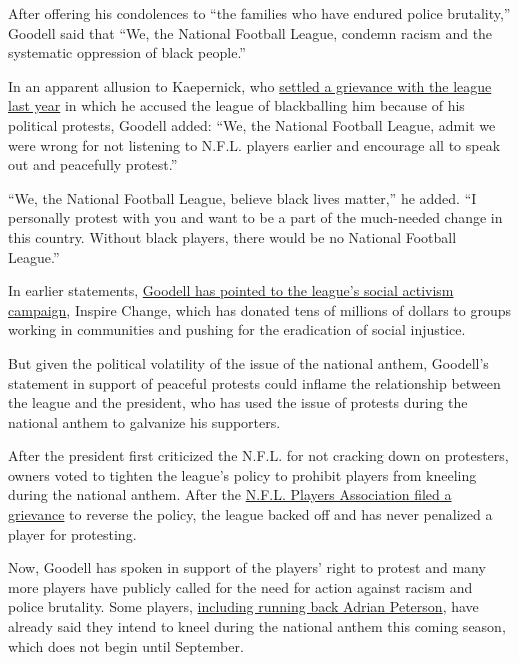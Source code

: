 After offering his condolences to ``the families who have endured police
brutality,'' Goodell said that ``We, the National Football League,
condemn racism and the systematic oppression of black people.''

In an apparent allusion to Kaepernick, who
\href{https://www.nytimes3xbfgragh.onion/2019/03/21/sports/colin-kaepernick-nfl-settlement.html}{settled
a grievance with the league last year} in which he accused the league of
blackballing him because of his political protests, Goodell added: ``We,
the National Football League, admit we were wrong for not listening to
N.F.L. players earlier and encourage all to speak out and peacefully
protest.''

``We, the National Football League, believe black lives matter,'' he
added. ``I personally protest with you and want to be a part of the
much-needed change in this country. Without black players, there would
be no National Football League.''

In earlier statements,
\href{https://www.instagram.com/p/CBB6ewBA-aO/?igshid=1w2oif5h7qxgi}{Goodell
has pointed to the league's social activism campaign}, Inspire Change,
which has donated tens of millions of dollars to groups working in
communities and pushing for the eradication of social injustice.

But given the political volatility of the issue of the national anthem,
Goodell's statement in support of peaceful protests could inflame the
relationship between the league and the president, who has used the
issue of protests during the national anthem to galvanize his
supporters.

After the president first criticized the N.F.L. for not cracking down on
protesters, owners voted to tighten the league's policy to prohibit
players from kneeling during the national anthem. After the
\href{https://www.nytimes3xbfgragh.onion/2018/07/10/sports/nfl-anthem.html}{N.F.L.
Players Association filed a grievance} to reverse the policy, the league
backed off and has never penalized a player for protesting.

Now, Goodell has spoken in support of the players' right to protest and
many more players have publicly called for the need for action against
racism and police brutality. Some players,
\href{https://profootballtalk.nbcsports.com/2020/06/05/adrian-peterson-will-without-a-doubt-kneel-during-national-anthem/}{including
running back Adrian Peterson}, have already said they intend to kneel
during the national anthem this coming season, which does not begin
until September.

